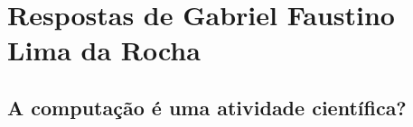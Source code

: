 \section{Respostas de Gabriel Faustino Lima da Rocha}

\subsection{A computação é uma atividade científica?}
